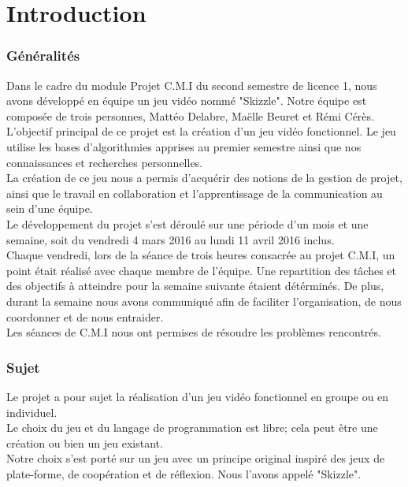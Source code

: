 \chapter{Introduction}

\subsection {Généralités}
Dans le cadre du module Projet C.M.I du second semestre de licence 1,
nous avons développé en équipe un jeu vidéo nommé "Skizzle".
Notre équipe est composée de trois personnes, Mattéo Delabre, Maëlle Beuret
 et Rémi Cérès.
\\

L'objectif principal de ce projet est la création d'un jeu vidéo fonctionnel. Le jeu utilise les bases d'algorithmies apprises au premier semestre ainsi que nos connaissances et
recherches personnelles.\\
La création de ce jeu nous a permis d'acquérir des notions de la gestion de projet, ainsi que le travail en collaboration et l'apprentissage de la
communication au sein d'une équipe.
\\

Le développement du projet s'est déroulé sur une période d'un mois et une semaine,
soit du vendredi 4 mars 2016 au lundi 11 avril 2016 inclus.\\
Chaque vendredi,
lors de la séance de trois heures consacrée au projet C.M.I, un point était réalisé avec chaque membre de l'équipe.
Une repartition des tâches et des objectifs
à atteindre pour la semaine suivante étaient détérminés. De plus, durant la semaine nous avons communiqué afin de faciliter l'organisation, de nous coordonner et de nous entraider.\\

Les séances de C.M.I nous ont permises de résoudre les problèmes rencontrés.

\subsection {Sujet}
Le projet a pour sujet la réalisation d'un jeu vidéo
fonctionnel en groupe ou en individuel.\\
Le choix du jeu et du langage de programmation est libre; cela peut être une création ou bien un jeu existant.\\

Notre choix s'est porté sur un jeu avec un principe original inspiré des jeux de
plate-forme, de coopération et de réflexion. Nous l'avons appelé "Skizzle".\\


